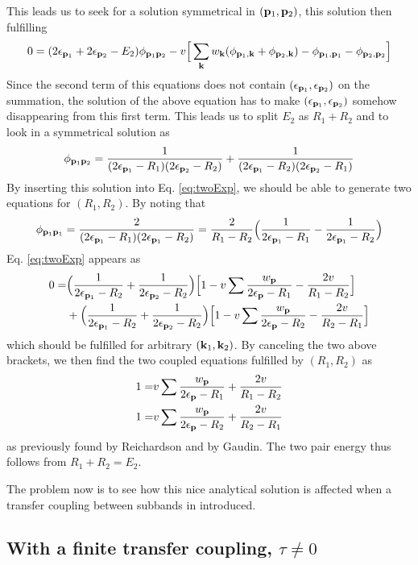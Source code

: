 \documentclass[11pt]{article} %
\begin{document}
This leads us to seek for a solution symmetrical in $(\mathbf{p}_1,\mathbf{p}_2)$, this solution then fulfilling 
\begin{equation}\label{eq:twoExp}
0=(2\epsilon_{\mathbf{p}_1}+2\epsilon_{\mathbf{p}_2}-E_2)\phi_{\mathbf{p}_1\mathbf{p}_2}-v\Big[\sum_{\mathbf{k}}w_{\mathbf{k}}(\phi_{\mathbf{p}_1,\mathbf{k}}+\phi_{\mathbf{p}_2,\mathbf{k}})-\phi_{\mathbf{p}_1,\mathbf{p}_1}-\phi_{\mathbf{p}_2,\mathbf{p}_2}\Big]
\end{equation}
Since the second term of this equations does not contain $(\epsilon_{\mathbf{p}_1},\epsilon_{\mathbf{p}_2})$ on the {summation}, the solution of the above equation has to make $(\epsilon_{\mathbf{p}_1},\epsilon_{\mathbf{p}_2})$ somehow disappearing from this first term.  This leads us to split $E_2$ as $R_1+R_2$ and to look in a symmetrical solution as 
\begin{equation}
\phi_{\mathbf{p}_1\mathbf{p}_2}=\frac{1}{(2\epsilon_{\mathbf{p}_1}-R_1)(2\epsilon_{\mathbf{p}_2}-R_2)}+\frac{1}{(2\epsilon_{\mathbf{p}_1}-R_2)(2\epsilon_{\mathbf{p}_2}-R_1)}
\end{equation}
By inserting this solution into Eq. \ref{eq:twoExp}, we should be able to generate two equations for $(R_1,R_2)$.  By noting that 
\begin{equation}
\phi_{\mathbf{p}_1\mathbf{p}_1}=\frac{2}{(2\epsilon_{\mathbf{p}_1}-R_1)(2\epsilon_{\mathbf{p}_1}-R_2)}=\frac{2}{R_1-R_2}\Big(\frac{1}{2\epsilon_{\mathbf{p}_1}-R_1}-\frac{1}{2\epsilon_{\mathbf{p}_1}-R_2}\Big)
\end{equation}
Eq. \ref{eq:twoExp} appears as 
\begin{equation}
\begin{split}
0=&\Big(\frac{1}{2\epsilon_{\mathbf{p}_1}-R_2}+\frac{1}{2\epsilon_{\mathbf{p}_2}-R_2}\Big)\Big[1-v\sum\frac{w_{\mathbf{p}}}{2\epsilon_{\mathbf{p}}-R_1}-\frac{2v}{R_1-R_2}\Big]\\
&+\Big(\frac{1}{2\epsilon_{\mathbf{p}_1}-R_2}+\frac{1}{2\epsilon_{\mathbf{p}_2}-R_2}\Big)\Big[1-v\sum\frac{w_{\mathbf{p}}}{2\epsilon_{\mathbf{p}}-R_2}-\frac{2v}{R_2-R_1}\Big]
\end{split}
\end{equation}
which should be fulfilled for arbitrary $(\mathbf{k}_1,\mathbf{k}_2)$. By canceling the two above brackets, we then find the two coupled equations fulfilled by $(R_1,R_2)$ as 
\begin{equation}
\begin{split}
1=&v\sum\frac{w_{\mathbf{p}}}{2\epsilon_{\mathbf{p}}-R_1}+\frac{2v}{R_1-R_2}\\
1=&v\sum\frac{w_{\mathbf{p}}}{2\epsilon_{\mathbf{p}}-R_2}+\frac{2v}{R_2-R_1}
\end{split}
\end{equation}
as previously found by Reichardson and by Gaudin. The two pair energy thus follows from $R_1+R_2=E_2$. 

  The problem now is to see how this nice analytical solution is affected when a transfer coupling between subbands in introduced.
  
  \subsection{With a finite transfer coupling, $\tau\neq0$}




\end{document}
